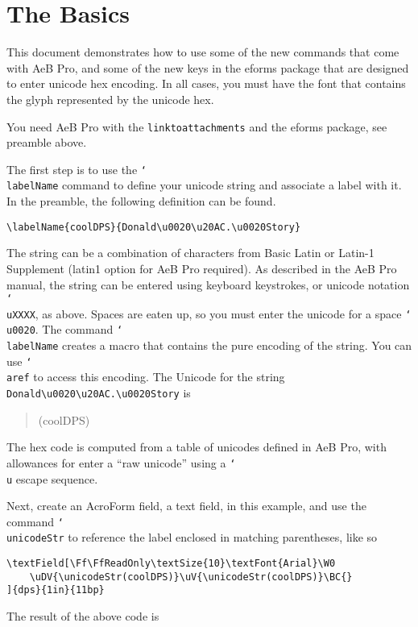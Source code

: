 \documentclass{article}
\newcommand{\cs}[1]{\texttt{\char`\\#1}}
\begin{document}
\makeinlinetitle

\section{The Basics}

This document demonstrates how to use some of the new commands that
come with AeB Pro, and some of the new keys in the eforms package
that are designed to enter unicode hex encoding. In all cases, you must have
the font that contains the glyph represented by the unicode hex.

You need AeB Pro with the \texttt{linktoattachments} and the eforms package, see
preamble above.

The first step is to use the \cs{labelName} command to define your unicode string
and associate a label with it. In the preamble, the following definition can be found.
\begin{verbatim}
\labelName{coolDPS}{Donald\u0020\u20AC.\u0020Story}
\end{verbatim}
The string can be a combination of characters from Basic Latin or
Latin-1 Supplement (latin1 option for AeB Pro required). As
described in the AeB Pro manual, the string can be entered using
keyboard keystrokes, or unicode notation \cs{uXXXX}, as above.
Spaces are eaten up, so you must enter the unicode for a space
\cs{u0020}. The command \cs{labelName} creates a macro that contains
the pure encoding of the string. You can use \cs{aref} to access
this encoding.
The Unicode for the string \verb!Donald\u0020\u20AC.\u0020Story! is
\begin{quote}
\unicodeStr(coolDPS)
\end{quote}
The hex code is computed from a table of unicodes defined in AeB Pro, with allowances for enter
a ``raw unicode'' using a \cs{u} escape sequence.

Next, create an AcroForm field, a text field, in this example, and
use the command \cs{unicodeStr} to reference the label enclosed
in matching parentheses, like so
\begin{verbatim}
\textField[\Ff\FfReadOnly\textSize{10}\textFont{Arial}\W0
    \uDV{\unicodeStr(coolDPS)}\uV{\unicodeStr(coolDPS)}\BC{}
]{dps}{1in}{11bp}
\end{verbatim}
The result of the above code is

\end{document}

